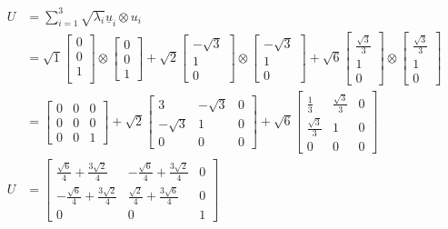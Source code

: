 \begin{align*}
U&=\sum_{i=1}^3 \sqrt{ \lambda_{i} }\underline{u}_{i}\otimes u_{i}\\[10pt]
&=\sqrt{ 1 }\begin{bmatrix}
0 \\
0 \\
1 \\
\end{bmatrix}\otimes 
\begin{bmatrix}
0 \\
0 \\
1
\end{bmatrix}+\sqrt{ 2 }\begin{bmatrix}
-\sqrt{ 3 } \\
1 \\
0
\end{bmatrix}\otimes \begin{bmatrix}
-\sqrt{ 3 } \\
1 \\
0
\end{bmatrix}+\sqrt{ 6 }\begin{bmatrix}
\frac{\sqrt{ 3 }}{3} \\
1 \\
0
\end{bmatrix}\otimes 
\begin{bmatrix}
\frac{\sqrt{ 3 }}{3} \\
1 \\
0
\end{bmatrix}\\[10pt]
&=\begin{bmatrix}
0 & 0 & 0 \\
0 & 0 & 0  \\
0 & 0 & 1
\end{bmatrix}+\sqrt{ 2 }\begin{bmatrix}
3 & -\sqrt{ 3 } & 0 \\
-\sqrt{ 3 } & 1 & 0 \\
0 & 0 & 0
\end{bmatrix}+\sqrt{ 6 }\begin{bmatrix}
\frac{1}{3} & \frac{\sqrt{ 3 }}{3} & 0 \\
\frac{\sqrt{ 3 }}{3} & 1 & 0 \\
0 & 0 & 0
\end{bmatrix}\\[10pt]
U&=\begin{bmatrix}
\frac{\sqrt{ 6 }}{4}+\frac{3\sqrt{ 2 }}{4} & -\frac{\sqrt{ 6 }}{4}+\frac{3\sqrt{ 2 }}{4} & 0 \\
-\frac{\sqrt{ 6 }}{4}+\frac{3\sqrt{ 2 }}{4} & \frac{\sqrt{ 2 }}{4}+\frac{3\sqrt{ 6 }}{4} & 0 \\
0 & 0 & 1
\end{bmatrix}
\end{align*}

